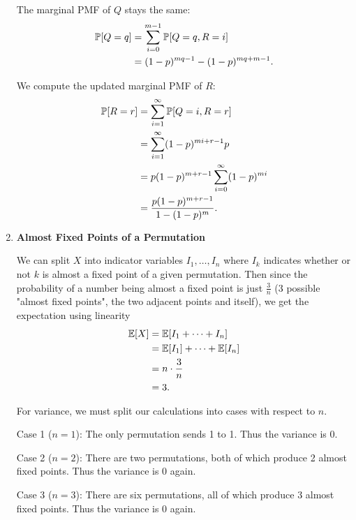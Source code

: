 \begin{enumerate}
    The marginal PMF of $Q$ stays the same:
     \begin{align*}
        \P[Q = q] &= \sum\limits_{i = 0}^{m - 1}\P[Q = q, R = i] \\
            &= (1 - p)^{mq - 1} - (1 - p)^{mq + m - 1}.
    \end{align*}
    
    We compute the updated marginal PMF of $R$:
    \begin{align*}
        \P[R = r] &= \sum\limits_{i = 1}^\infty\P[Q = i, R = r] \\
        &= \sum\limits_{i = 1}^\infty(1 - p)^{mi + r - 1}p \\
        &= p(1-p)^{m + r - 1}\sum\limits_{i = 0}^\infty(1 - p)^{mi} \\
        &= \frac{p(1 - p)^{m + r - 1}}{1 - (1 - p)^m}.
    \end{align*}
    
    \item \textbf{Almost Fixed Points of a Permutation}
    
    We can split $X$ into indicator variables $I_1, \dots, I_n$ where $I_k$ indicates whether or not $k$ is almost a fixed point of a given permutation. Then since the probability of a number being almost a fixed point is just $\frac{3}{n}$ (3 possible "almost fixed points", the two adjacent points and itself), we get the expectation using linearity
    \begin{align*}
        \E[X] &= \E[I_1 + \dots + I_n] \\
            &= \E[I_1] + \dots + \E[I_n] \\
            &= n \cdot \frac{3}{n} \\
            &= 3.
    \end{align*}
    
    For variance, we must split our calculations into cases with respect to $n$.
    
    Case 1 ($n = 1$):
    The only permutation sends 1 to 1. Thus the variance is 0.
    
    Case 2 ($n = 2$):
    There are two permutations, both of which produce 2 almost fixed points. Thus the variance is 0 again.
    
    Case 3 ($n = 3$):
    There are six permutations, all of which produce 3 almost fixed points. Thus the variance is 0 again.
    

\end{enumerate}
